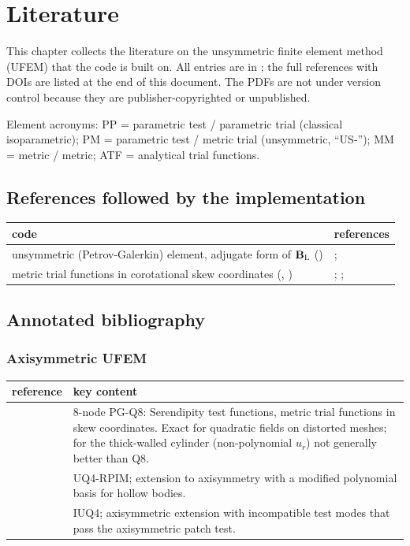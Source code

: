 \chapter{Literature}
\label{ch:literature}

This chapter collects the literature on the unsymmetric finite element method
(UFEM) that the code is built on. All entries are in
; the full references with DOIs are listed at the
end of this document. The PDFs are not under version control because they are
publisher-copyrighted or unpublished.

Element acronyms: PP = parametric test / parametric trial (classical
isoparametric); PM = parametric test / metric trial (unsymmetric, ``US-''); MM =
metric / metric; ATF = analytical trial functions.

\section{References followed by the implementation}

\begin{xltabular}{\linewidth}{@{}LP{6.2cm}@{}}
  \toprule
  code & references \\
  \midrule
  unsymmetric (Petrov-Galerkin) element, adjugate form of $\mathbf{B}_\mathrm{L}$
    () &
    \textcite{Rajendran2010technique}; \textcite{Rajendran2003novel} \\
  metric trial functions in corotational skew coordinates
    (, ) &
    \textcite{Xie2016Modified}; \textcite{Yuan1993New};
    \textcite{Ooi2008Remedies} \\
  \bottomrule
\end{xltabular}

\section{Annotated bibliography}

\newcommand{\littable}[1]{%
  \begin{xltabular}{\linewidth}{@{}P{4.4cm}L@{}}
    \toprule
    reference & key content \\
    \midrule
    \endhead
    #1
    \bottomrule
  \end{xltabular}}

\subsection{Axisymmetric UFEM}
\littable{
  \textcite{Zaehringer2024finite} & 8-node PG-Q8: Serendipity test functions, metric
    trial functions in skew coordinates. Exact for quadratic fields on distorted
    meshes; for the thick-walled cylinder (non-polynomial $u_r$) not generally
    better than Q8. \\
  \textcite{Dou2025novel} & UQ4-RPIM; extension to axisymmetry with a modified
    polynomial basis for hollow bodies. \\
  \textcite{Huang2020incompatible} & IUQ4; axisymmetric extension with incompatible
    test modes that pass the axisymmetric patch test. \\
}

